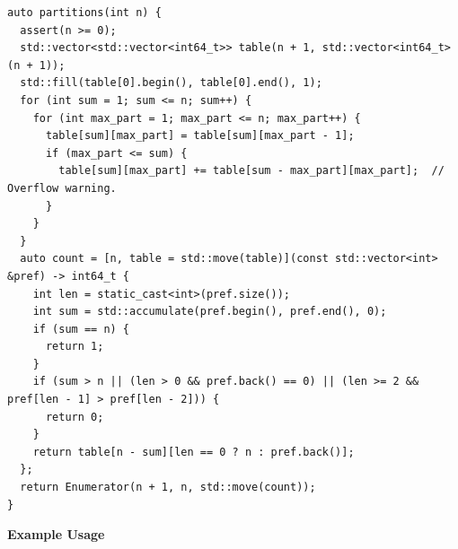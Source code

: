 \begin{lstlisting}[style=cpp]
auto partitions(int n) {
  assert(n >= 0);
  std::vector<std::vector<int64_t>> table(n + 1, std::vector<int64_t>(n + 1));
  std::fill(table[0].begin(), table[0].end(), 1);
  for (int sum = 1; sum <= n; sum++) {
    for (int max_part = 1; max_part <= n; max_part++) {
      table[sum][max_part] = table[sum][max_part - 1];
      if (max_part <= sum) {
        table[sum][max_part] += table[sum - max_part][max_part];  // Overflow warning.
      }
    }
  }
  auto count = [n, table = std::move(table)](const std::vector<int> &pref) -> int64_t {
    int len = static_cast<int>(pref.size());
    int sum = std::accumulate(pref.begin(), pref.end(), 0);
    if (sum == n) {
      return 1;
    }
    if (sum > n || (len > 0 && pref.back() == 0) || (len >= 2 && pref[len - 1] > pref[len - 2])) {
      return 0;
    }
    return table[n - sum][len == 0 ? n : pref.back()];
  };
  return Enumerator(n + 1, n, std::move(count));
}
\end{lstlisting}
\textbf{Example Usage}\par
